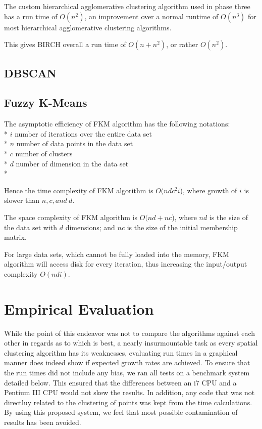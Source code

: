 \documentclass[conference, 10pt]{IEEEtran}
\begin{document}
  The custom hierarchical agglomerative clustering algorithm used in phase three has a run time of $O(n^2)$, an improvement over a normal runtime of $O(n^3)$ for most hierarchical agglomerative clustering algorithms.

  This gives BIRCH overall a run time of $O(n+n^2)$, or rather $O(n^2)$.
  \subsection{DBSCAN}


  \subsection{Fuzzy K-Means}
  The asymptotic efficiency of FKM algorithm has the following notations:\\*
  $i$ number of iterations over the entire data set\\*
  $n$ number of data points in the data set\\*
  $c$ number of clusters\\*
  $d$ number of dimension in the data set\\*

  Hence the time complexity of FKM algorithm is $O(ndc^2i$), where growth of $i$ is slower than $n, c, and\:d$.

  The space complexity of FKM algorithm is $O(nd+nc$), where $nd$ is the size of the data set with $d$ dimensions; and $nc$ is the size of the initial membership matrix.

  For large data sets, which cannot be fully loaded into the memory, FKM algorithm will access
  disk for every iteration, thus increasing the input/output complexity $O(ndi)$.

  \section{Empirical Evaluation}
  While the point of this endeavor was not to compare the algorithms against each other in regards as to which is best, a nearly insurmountable task as every spatial clustering algorithm has its weaknesses, evaluating run times in a graphical manner does indeed show if expected growth rates are achieved. To ensure that the run times did not include any bias, we ran all tests on a benchmark system detailed below. This ensured that the differences between an i7 CPU and a Pentium III CPU would not skew the results. In addition, any code that was not directluy related to the clustering of points was kept from the time calculations. By using this proposed system, we feel that most possible contamination of results has been avoided.
\end{document}
